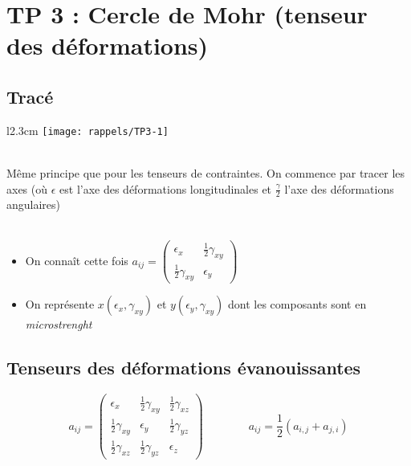 \section*{TP 3 : Cercle de Mohr (tenseur des déformations)}
\subsection*{Tracé}

\begin{wrapfigure}[4]{l}{2.3cm}
	\texttt{[image: rappels/TP3-1]}
\end{wrapfigure}	
\ \\ Même principe que pour les tenseurs de contraintes. On commence par tracer les axes (où $\epsilon$ est l'axe des déformations longitudinales et $\frac{\gamma}{2}$ l'axe des déformations angulaires)\\\\

\begin{itemize}	
	\item On connaît cette fois $a_{ij} = 
	      \left(	
	      \begin{array}{cc}
	      	\epsilon _x             & \frac{1}{2}\gamma _{xy} \\ 
	      	\frac{1}{2}\gamma _{xy} & \epsilon _y             
	      \end{array}
	      \right) $
	      	
	\item On représente $x(\epsilon _x,\gamma _{xy})$ et $y(\epsilon _y ,\gamma _{xy})$ dont les composants sont en \textit{microstrenght}
\end{itemize}

\subsection*{Tenseurs des déformations évanouissantes}
\begin{equation}
	a_ {ij} = 
	\left(
	\begin{array}{ccc}
		\epsilon _x             & \frac{1}{2}\gamma _{xy} & \frac{1}{2}\gamma _{xz} \\ 
		\frac{1}{2}\gamma _{xy} & \epsilon _y             & \frac{1}{2}\gamma _{yz} \\ 
		\frac{1}{2}\gamma _{xz} & \frac{1}{2}\gamma _{yz} & \epsilon _z             
	\end{array} 
	\right)
	\qquad \qquad
	a_{ij} = \frac{1}{2}(a_{i,j} + a_{j,i})
\end{equation}

